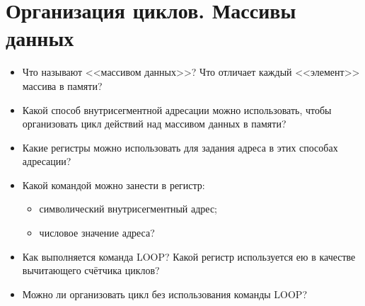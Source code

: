 \chapter{Организация циклов. Массивы данных}
\begin{itemize}
\item Что называют <<массивом данных>>? Что отличает каждый <<элемент>> массива в памяти?
\item Какой способ внутрисегментной адресации можно использовать, чтобы организовать цикл действий над массивом данных в памяти?
\item Какие регистры можно использовать для задания адреса в этих способах адресации?
\item Какой командой можно занести в регистр:
    \begin{itemize}
    \item символический внутрисегментный адрес;
    \item числовое значение адреса?
    \end{itemize}
\item Как выполняется команда LOOP? Какой регистр используется ею в качестве вычитающего счётчика циклов?
\item Можно ли организовать цикл без использования команды LOOP?
\end{itemize}
\endinput